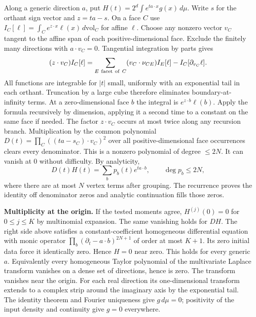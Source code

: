\documentclass[10pt]{article}
\begin{document}
Along a generic direction $a$, put $H(t)=2^d\int e^{ta\cdot x}g(x)\,d\mu$. Write $s$ for the orthant sign vector and $z=ta-s$. On a face $C$ use $I_C[\ell]=\int_C e^{z\cdot x}\ell(x)\,d\mathrm{vol}_C$ for affine $\ell$. Choose any nonzero vector $v_C$ tangent to the affine span of each positive-dimensional face. Exclude the finitely many directions with $a\cdot v_C=0$. Tangential integration by parts gives
\[
 (z\cdot v_C) I_C[\ell]=
 \sum_{E\ {\rm facet\ of}\ C}(v_C\cdot\nu_{CE}) I_E[\ell] - I_C[\partial_{v_C}\ell].
\]
All functions are integrable for $|t|$ small, uniformly with an exponential tail in each orthant. Truncation by a large cube therefore eliminates boundary-at-infinity terms. At a zero-dimensional face $b$ the integral is $e^{z\cdot b}\ell(b)$. Apply the formula recursively by dimension, applying it a second time to a constant on the same face if needed. The factor $z\cdot v_C$ occurs at most twice along any recursion branch. Multiplication by the common polynomial $D(t)=\prod_C((ta-s_C)\cdot v_C)^2$ over all positive-dimensional face occurrences clears every denominator. This is a nonzero polynomial of degree $\le2N$. It can vanish at $0$ without difficulty. By analyticity,
\[
 D(t) H(t)=\sum_{b} p_b(t)e^{t a\cdot b},\qquad \deg p_b\le2N ,
\]
where there are at most $N$ vertex terms after grouping. The recurrence proves the identity off denominator zeros and analytic continuation fills those zeros.

\textbf{Multiplicity at the origin.} If the tested moments agree, $H^{(j)}(0)=0$ for $0\le j\le K$ by multinomial expansion. The same vanishing holds for $DH$. The right side above satisfies a constant-coefficient homogeneous differential equation with monic operator $\prod_b(\partial_t-a\cdot b)^{2N+1}$ of order at most $K+1$. Its zero initial data force it identically zero. Hence $H=0$ near zero. This holds for every generic $a$. Equivalently every homogeneous Taylor polynomial of the multivariate Laplace transform vanishes on a dense set of directions, hence is zero. The transform vanishes near the origin. For each real direction its one-dimensional transform extends to a complex strip around the imaginary axis by the exponential tail. The identity theorem and Fourier uniqueness give $g\,d\mu=0$; positivity of the input density and continuity give $g=0$ everywhere.
\end{document}
